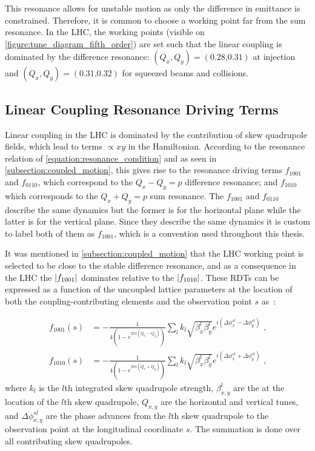 This resonance allows for unstable motion as only the difference in emittance is constrained.
Therefore, it is common to choose a working point far from the sum resonance.
In the LHC, the working points (visible on \cref{figure:tune_diagram_fifth_order}) are set such that the linear coupling is dominated by the difference resonance: \((Q_x, Q_y) = (0.28 \text{,} 0.31)\) at injection and \((Q_x, Q_y) = (0.31 \text{,} 0.32)\) for squeezed beams and collisions.

\subsection{Linear Coupling Resonance Driving Terms}
\label{subsection:measurement_coupling_rdts}

Linear coupling in the LHC is dominated by the contribution of skew quadrupole fields, which lead to terms \(\propto xy\) in the Hamiltonian.
According to the resonance relation of \cref{equation:resonance_condition} and as seen in \cref{subsection:coupled_motion}, this gives rise to the resonance driving terms \(f_{1001}\) and \(f_{0110}\), which correspond to the \(Q_x - Q_y = p\) difference resonance; and \(f_{1010}\) which corresponds to the \(Q_x + Q_y = p\) sum resonance.
The \(f_{1001}\) and \(f_{0110}\) describe the same dynamics but the former is for the horizontal plane while the latter is for the vertical plane.
Since they describe the same dynamics it is custom to label both of them as \(f_{1001}\), which is a convention used throughout this thesis.

It was mentioned in \cref{subsection:coupled_motion} that the LHC working point is selected to be close to the stable difference resonance, and as a consequence in the LHC the \(\left\lvert f_{1001} \right\rvert\) dominates relative to the \(\left\lvert f_{1010} \right\rvert\).
These RDTs can be expressed as a function of the uncoupled lattice parameters at the location of both the coupling-contributing elements and the observation point \(s\) as~\cite{PHREV:Guignard:Betatron_Coupling_Radiation}:

\begin{equation}
    \begin{aligned}
        f_{1001}(s) &= - \frac{1}{4 \left(1 - e^{2 \pi i \left(Q_x - Q_y \right)}\right)} \sum_l k_l \sqrt{\beta_x^l \beta_y^l} e^{i \left(\Delta \phi_x^{s l} - \Delta \phi_y^{s l}\right)} \text{ ,} \\
        f_{1010}(s) &= - \frac{1}{4 \left(1 - e^{2 \pi i \left(Q_x + Q_y \right)}\right)} \sum_l k_l \sqrt{\beta_x^l \beta_y^l} e^{i \left(\Delta \phi_x^{s l} + \Delta \phi_y^{s l}\right)} \text{ ,}
    \end{aligned}
    \label{equation:coupling_rdts_from_skew_quads}
\end{equation}
where \(k_l\) is the \(l\)th integrated skew quadrupole strength, \(\beta_{x,y}^{l}\) are the \betafunctions at the location of the \(l\)th skew quadrupole, \(Q_{x,y}\) are the horizontal and vertical tunes, and \(\Delta \phi_{x,y}^{s l}\) are the phase advances from the \(l\)th skew quadrupole to the observation point at the longitudinal coordinate \(s\).
The summation is done over all contributing skew quadrupoles.

